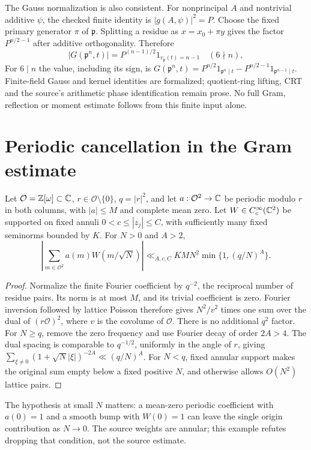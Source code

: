 The Gauss normalization is also consistent. For nonprincipal $A$ and
nontrivial additive $\psi$, the checked finite identity is
$|g(A,\psi)|^2=P$. Choose the fixed primary generator $\pi$ of $\mathfrak p$.
Splitting a residue as $x=x_0+\pi y$ gives the factor $P^{n/2-1}$ after additive orthogonality. Therefore
\[
 |G(\mathfrak p^n,t)|=P^{(n-1)/2}1_{v_{\mathfrak p}(t)=n-1}
 \quad(6\nmid n),
\]
For $6\mid n$ the value, including its sign, is
$G(\mathfrak p^n,t)=P^{n/2}1_{\mathfrak p^n\mid t}
-P^{n/2-1}1_{\mathfrak p^{n-1}\mid t}$.
Finite-field Gauss and kernel identities are formalized; quotient-ring
lifting, CRT and the source's arithmetic phase identification remain
prose. No full Gram, reflection or moment estimate follows from this
finite input alone.

\section{Periodic cancellation in the Gram estimate}
\begin{lemma}\label{lem:gram-poisson}
Let $\mathcal O=\mathbb Z[\omega]\subset\mathbb C$, $r\in\mathcal O\setminus\{0\}$, $q=|r|^2$,
and let $a:\mathcal O^2\to\mathbb C$ be periodic modulo $r$ in both columns,
with $|a|\le M$ and complete mean zero. Let $W\in C_c^\infty(\mathbb C^2)$
be supported on fixed annuli $0<c\le|z_j|\le C$, with sufficiently many
fixed seminorms bounded by $K$. For $N>0$ and $A>2$,
\[
 \left|\sum_{m\in\mathcal O^2}a(m)W(m/\sqrt N)\right|
 \ll_{A,c,C} KMN^2\min\{1,(q/N)^A\}.
\]
\end{lemma}
\begin{proof}
Normalize the finite Fourier coefficient by $q^{-2}$, the reciprocal
number of residue pairs. Its norm is at most $M$, and its trivial
coefficient is zero. Fourier inversion followed by lattice Poisson
therefore gives $N^2/v^2$ times one sum over the dual of
$(r\mathcal O)^2$, where $v$ is the covolume of $\mathcal O$.
There is no additional $q^2$ factor. For $N\ge q$, remove the zero
frequency and use Fourier decay of order $2A>4$. The dual spacing is
comparable to $q^{-1/2}$, uniformly in the angle of $r$, giving
$\sum_{\xi\ne0}(1+\sqrt N|\xi|)^{-2A}\ll(q/N)^A$.
For $N<q$, fixed annular support makes the original sum empty below
a fixed positive $N$, and otherwise allows $O(N^2)$ lattice pairs.
\end{proof}

The hypothesis at small $N$ matters: a mean-zero periodic coefficient
with $a(0)=1$ and a smooth bump with $W(0)=1$ can leave the single
origin contribution as $N\to0$. The source weights are annular;
this example refutes dropping that condition, not the source estimate.

